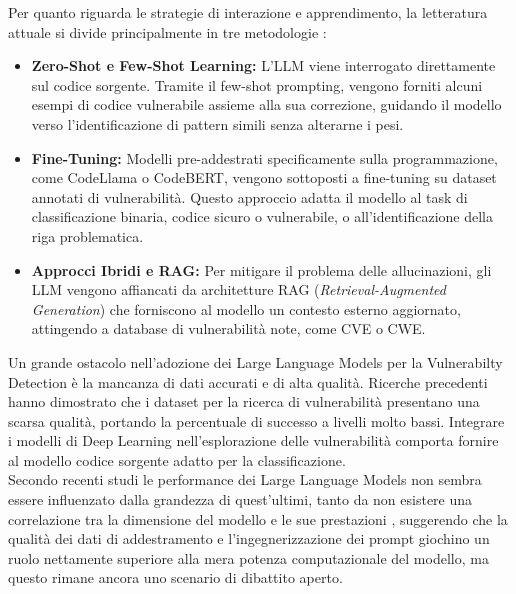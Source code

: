 Per quanto riguarda le strategie di interazione e apprendimento, la letteratura attuale si divide principalmente in tre metodologie \cite{gao2023fargonevulnerabilitydetection}:
\begin{itemize}
    \item \textbf{Zero-Shot e Few-Shot Learning:} L'LLM viene interrogato direttamente sul codice sorgente. Tramite il few-shot prompting, vengono forniti alcuni esempi di codice vulnerabile assieme alla sua correzione, guidando il modello verso l'identificazione di pattern simili senza alterarne i pesi.
    \item \textbf{Fine-Tuning:} Modelli pre-addestrati specificamente sulla programmazione, come CodeLlama o CodeBERT, vengono sottoposti a fine-tuning su dataset annotati di vulnerabilità. Questo approccio adatta il modello al task di classificazione binaria, codice sicuro o vulnerabile, o all'identificazione della riga problematica.
    \item \textbf{Approcci Ibridi e RAG:} Per mitigare il problema delle allucinazioni, gli LLM vengono affiancati da architetture RAG (\textit{Retrieval-Augmented Generation}) che forniscono al modello un contesto esterno aggiornato, attingendo a database di vulnerabilità note, come CVE o CWE.
\end{itemize}

Un grande ostacolo nell'adozione dei Large Language Models per la Vulnerabilty Detection è la mancanza di dati accurati e di alta qualità. Ricerche precedenti hanno dimostrato che i dataset per la ricerca di vulnerabilità presentano una scarsa qualità, portando la percentuale di successo a livelli molto bassi.
Integrare i modelli di Deep Learning nell'esplorazione delle vulnerabilità comporta fornire al modello codice sorgente adatto per la classificazione.\\

Secondo recenti studi le performance dei Large Language Models non sembra essere influenzato dalla grandezza di quest'ultimi, tanto da non esistere una correlazione tra la dimensione del modello e le sue prestazioni \cite{steenhoek2025errmachinevulnerabilitydetection}, suggerendo che la qualità dei dati di addestramento e l'ingegnerizzazione dei prompt giochino un ruolo nettamente superiore alla mera potenza computazionale del modello, ma questo rimane ancora uno scenario di dibattito aperto.\\




